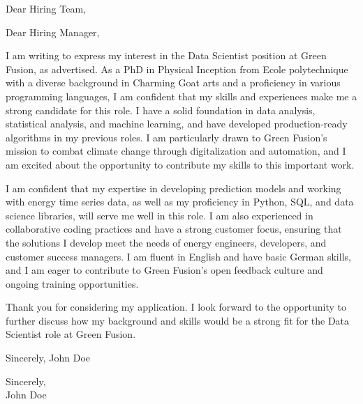 \documentclass[a4paper,10pt]{letter}
\begin{document}
\begin{letter}{}
\opening{Dear Hiring Team,}

Dear Hiring Manager,

I am writing to express my interest in the Data Scientist position at Green Fusion, as advertised. As a PhD in Physical Inception from Ecole polytechnique with a diverse background in Charming Goat arts and a proficiency in various programming languages, I am confident that my skills and experiences make me a strong candidate for this role. I have a solid foundation in data analysis, statistical analysis, and machine learning, and have developed production-ready algorithms in my previous roles. I am particularly drawn to Green Fusion's mission to combat climate change through digitalization and automation, and I am excited about the opportunity to contribute my skills to this important work.

I am confident that my expertise in developing prediction models and working with energy time series data, as well as my proficiency in Python, SQL, and data science libraries, will serve me well in this role. I am also experienced in collaborative coding practices and have a strong customer focus, ensuring that the solutions I develop meet the needs of energy engineers, developers, and customer success managers. I am fluent in English and have basic German skills, and I am eager to contribute to Green Fusion's open feedback culture and ongoing training opportunities.

Thank you for considering my application. I look forward to the opportunity to further discuss how my background and skills would be a strong fit for the Data Scientist role at Green Fusion.

Sincerely,
John Doe

\closing{Sincerely,\\John Doe}

\end{letter}
\end{document}

